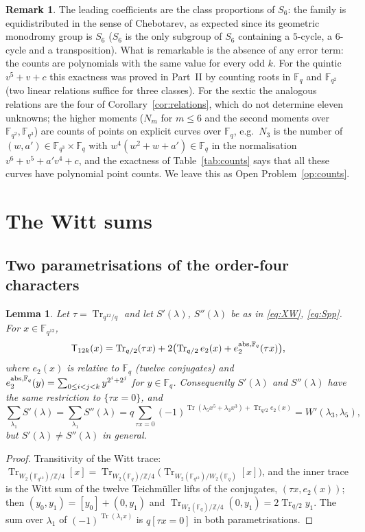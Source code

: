 \documentclass[12pt,a4paper]{amsart}
\newtheorem{lemma}[theorem]{Lemma}
\theoremstyle{definition}
\newtheorem{remark}[theorem]{Remark}
\newcommand{\F}{\mathbb{F}}
\newcommand{\Z}{\mathbb{Z}}
\newcommand{\Tr}{\operatorname{Tr}}
\newcommand{\Spp}{S''}
\begin{document}
\begin{remark}
The leading coefficients are the class proportions of $S_6$: the family is equidistributed in the sense of Chebotarev, as expected since its geometric monodromy group is $S_6$ ($S_6$ is the only subgroup of $S_6$ containing a $5$-cycle, a $6$-cycle and a transposition). What is remarkable is the absence of any error term: the counts are polynomials with the same value for every odd $k$. For the quintic $v^5+v+c$ this exactness was proved in Part~II by counting roots in $\F_q$ and $\F_{q^2}$ (two linear relations suffice for three classes). For the sextic the analogous relations are the four of Corollary~\ref{cor:relations}, which do not determine eleven unknowns; the higher moments ($N_m$ for $m\le6$ and the second moments over $\F_{q^2},\F_{q^3}$) are counts of points on explicit curves over $\F_q$, e.g.\ $N_3$ is the number of $(w,a')\in\F_{q^3}\times\F_q$ with $w^4(w^2+w+a')\in\F_q$ in the normalisation $v^6+v^5+a'v^4+c$, and the exactness of Table~\ref{tab:counts} says that all these curves have polynomial point counts. We leave this as Open Problem~\ref{op:counts}.
\end{remark}

\section{The Witt sums}\label{sec:witt}

\subsection{Two parametrisations of the order-four characters}
\begin{lemma}\label{lem:SpSpp}
Let $\tau=\Tr_{q^{12}/q}$ and let $S'(\lambda)$, $\Spp(\lambda)$ be as in \eqref{eq:XW}, \eqref{eq:Spp}. For $x\in\F_{q^{12}}$,
\[
\mathsf T_{12k}(x)=\Tr_{q/2}(\tau x)+2\bigl(\Tr_{q/2}e_2(x)+e_2^{{\rm abs},\F_q}(\tau x)\bigr),
\]
where $e_2(x)$ is relative to $\F_q$ (twelve conjugates) and $e_2^{{\rm abs},\F_q}(y)=\sum_{0\le i<j<k}y^{2^i+2^j}$ for $y\in\F_q$. Consequently $S'(\lambda)$ and $\Spp(\lambda)$ have the same restriction to $\{\tau x=0\}$, and
\[
\sum_{\lambda_1}S'(\lambda)=\sum_{\lambda_1}\Spp(\lambda)=q\sum_{\tau x=0}(-1)^{\Tr(\lambda_5x^5+\lambda_3x^3)+\Tr_{q/2}e_2(x)}=W'(\lambda_3,\lambda_5),
\]
but $S'(\lambda)\ne\Spp(\lambda)$ in general.
\end{lemma}
\begin{proof}
Transitivity of the Witt trace: $\Tr_{W_2(\F_{q^{12}})/\Z/4}[x]=\Tr_{W_2(\F_q)/\Z/4}\bigl(\Tr_{W_2(\F_{q^{12}})/W_2(\F_q)}[x]\bigr)$, and the inner trace is the Witt sum of the twelve Teichm\"uller lifts of the conjugates, $(\tau x,e_2(x))$; then $(y_0,y_1)=[y_0]+(0,y_1)$ and $\Tr_{W_2(\F_q)/\Z/4}(0,y_1)=2\Tr_{q/2}y_1$. The sum over $\lambda_1$ of $(-1)^{\Tr(\lambda_1x)}$ is $q[\tau x=0]$ in both parametrisations.
\end{proof}
\end{document}
